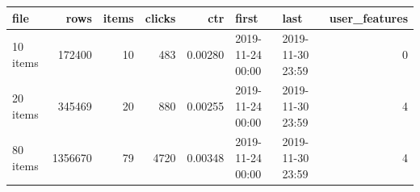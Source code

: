 \begin{tabular}{lrrrrllr}
\toprule
file & rows & items & clicks & ctr & first & last & user\_features \\
\midrule
10 items & 172400 & 10 & 483 & 0.00280 & 2019-11-24 00:00 & 2019-11-30 23:59 & 0 \\
20 items & 345469 & 20 & 880 & 0.00255 & 2019-11-24 00:00 & 2019-11-30 23:59 & 4 \\
80 items & 1356670 & 79 & 4720 & 0.00348 & 2019-11-24 00:00 & 2019-11-30 23:59 & 4 \\
\bottomrule
\end{tabular}

